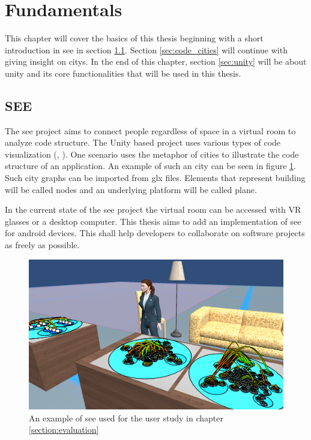 \section{Fundamentals}
\label{sec:fundamentals}
This chapter will cover the basics of this thesis beginning with a short introduction in \gls{see} in section \ref{sec:see}.
Section \ref{sec:code_cities} will continue with giving insight on \glspl{city}. 
In the end of this chapter, section \ref{sec:unity} will be about \gls{unity} and its core functionalities that will be used in this thesis.

\subsection{SEE}
\label{sec:see}
The \gls{see} project aims to connect people regardless of space in a virtual room to analyze code structure. 
The Unity based project uses various types of code visualization (\cite{koschke}, \cite{DBLP:conf/iwsc/KoschkeS21}). 
One scenario uses the metaphor of cities to illustrate the code structure of an application.
An example of such an \gls{city} can be seen in figure \ref{fig:see_example}.
Such city graphs can be imported from \gls{glx} files.
Elements that represent building will be called \glspl{node} and an underlying platform will be called \gls{plane}.

In the current state of the \gls{see} project the virtual room can be accessed with VR glasses or a desktop computer.
This thesis aims to add an implementation of \gls{see} for \gls{android} devices.
This shall help developers to collaborate on software projects as freely as possible.
\begin{figure}[htb]
    \centering
    \includegraphics[width=1\textwidth]{Fundamentals/img/SEE.png}
    \caption{An example of \gls{see} used for the user study in chapter \ref{section:evaluation}}
    \label{fig:see_example}
\end{figure}

